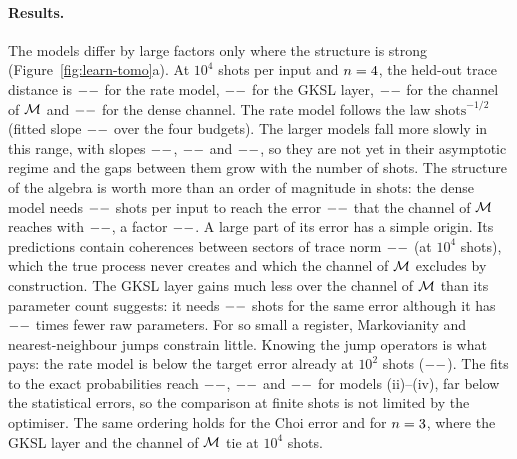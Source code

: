 \paragraph{Results.} The models differ by large factors only where the structure is strong
(Figure~\ref{fig:learn-tomo}a). At $10^4$ shots per input and $n=4$, the held-out trace distance is
$--$ for the rate model, $--$ for the GKSL layer, $--$ for the channel of $\mathcal{M}$
and $--$ for the dense channel. The rate model follows the law $\text{shots}^{-1/2}$ (fitted slope
$--$ over the four budgets). The larger models fall more slowly in this range, with slopes $--$,
$--$ and $--$, so they are not yet in their asymptotic regime and the gaps between them grow
with the number of shots. The structure of the algebra is worth more than an order of magnitude in shots: the dense
model needs $--$ shots per input to reach the error $--$ that the channel of $\mathcal{M}$ reaches with
$--$, a factor $--$. A large part of its error has a simple origin. Its predictions contain
coherences between sectors of trace norm $--$ (at $10^4$ shots), which the true process never creates and
which the channel of $\mathcal{M}$ excludes by construction. The GKSL layer gains much less over the channel of $\mathcal{M}$ than its
parameter count suggests: it needs $--$ shots for the same error although it has $--$ times
fewer raw parameters. For so small a register, Markovianity and nearest-neighbour jumps constrain little. Knowing the
jump operators is what pays: the rate model is below the target error already at $10^2$ shots ($--$). The
fits to the exact probabilities reach $--$, $--$ and $--$ for models
(ii)--(iv), far below the statistical errors, so the comparison at finite shots is not limited by the optimiser. The
same ordering holds for the Choi error and for $n=3$, where the GKSL layer and the channel of $\mathcal{M}$ tie at
$10^4$ shots.

